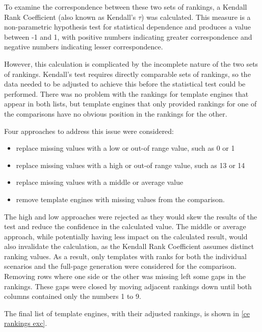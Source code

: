 \label{IN24}
To examine the correspondence between these two sets of rankings, a Kendall Rank Coefficient (also known as Kendall's $\tau$) was calculated. This measure is a non-parametric hypothesis test for statistical dependence and produces a value between -1 and 1, with positive numbers indicating greater correspondence and negative numbers indicating lesser correspondence.

However, this calculation is complicated by the incomplete nature of the two sets of rankings. Kendall's test requires directly comparable sets of rankings, so the data needed to be adjusted to achieve this before the statistical test could be performed. There was no problem with the rankings for template engines that appear in both lists, but template engines that only provided rankings for one of the comparisons have no obvious position in the rankings for the other.

Four approaches to address this issue were considered:

\begin{itemize}
\item replace missing values with a low or out-of range value, such as 0 or 1
\item replace missing values with a high or out-of range value, such as 13 or 14
\item replace missing values with a middle or average value
\item remove template engines with missing values from the comparison.
\end{itemize}

The high and low approaches were rejected as they would skew the results of the test and reduce the confidence in the calculated value. The middle or average approach, while potentially having less impact on the calculated result, would also invalidate the calculation, as the Kendall Rank Coefficient assumes distinct ranking values. As a result, only templates with ranks for both the individual scenarios and the full-page generation were considered for the comparison. Removing rows where one side or the other was missing left some gaps in the rankings. These gaps were closed by moving adjacent rankings down until both columns contained only the numbers 1 to 9.

The final list of template engines, with their adjusted rankings, is shown in \autoref{ce rankings exc}.

